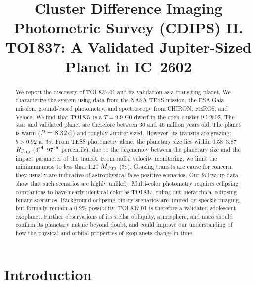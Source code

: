 \documentclass[12pt,twocolumn,tighten]{aastex63}
\begin{document}

\title{
  Cluster Difference Imaging Photometric Survey (CDIPS) II.
  TOI$\,$837: A Validated Jupiter-Sized Planet in IC~2602
}

\suppressAffiliations


\begin{abstract}
  We report the discovery of TOI 837.01 and its validation as a
  transiting planet.  We characterize the system using data from the
  NASA TESS mission, the ESA Gaia mission, ground-based photometry,
  and spectroscopy from CHIRON, FEROS, and Veloce.  We find that
  TOI$\,$837 is a $T=9.9$ G0 dwarf in the open cluster IC 2602.  The
  star and validated planet are therefore between 30 and 46 million
  years old.  The planet is warm ($P = 8.32\,{\rm d}$) and roughly
  Jupiter-sized.  However, its transits are grazing: $b > 0.92$ at
  3$\sigma$.  From TESS photometry alone, the planetary size lies
  within 0.58--3.87 $R_{\rm Jup}$ (3$^{\rm rd}$--97$^{\rm th}$
  percentile), due to the degeneracy between the planetary size and
  the impact parameter of the transit.  From radial velocity
  monitoring, we limit the minimum mass to less than 1.20 $M_{\rm
  Jup}$ (3$\sigma$).  Grazing transits are cause for concern: they
  usually are indicative of astrophysical false positive scenarios.
  Our follow-up data show that such scenarios are highly unlikely.
  Multi-color photometry requires eclipsing companions to have nearly
  identical color as TOI$\,$837, ruling out hierarchical eclipsing
  binary scenarios.  Background eclipsing binary scenarios are limited
  by speckle imaging, but formally remain a 0.2\% possibility.  TOI
  837.01 is therefore a validated adolescent exoplanet.  Further
  observations of its stellar obliquity, atmosphere, and mass should
  confirm its planetary nature beyond doubt, and could improve our
  understanding of how the physical and orbital properties of
  exoplanets change in time.
\end{abstract}




\section{Introduction}
\end{document}
